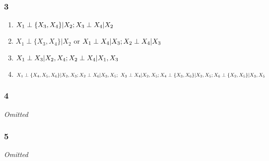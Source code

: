 \documentclass[11pt]{article}
\begin{document}
\begin{figure}[H]
\centering
\end{figure}

\subsubsection*{3}

\begin{enumerate}[label=(\alph*)]
    \item $X_1 \perp \{X_3, X_4\} | X_2; \\
    X_3 \perp X_4 | X_2$
    \item $X_1 \perp \{X_3, X_4\} | X_2$ or $X_1 \perp X_4 | X_3; \\ 
    X_2 \perp X_4 | X_3$
    \item $X_1 \perp X_3 | X_2, X_4; \\ 
    X_2 \perp X_4 | X_1, X_3$
    \item $X_1 \perp \{X_4, X_5, X_6\} | X_2, X_3; \\ 
    X_2 \perp X_6 | X_3, X_5; \ X_3 \perp X_4 | X_2, X_5; \\ 
    X_4 \perp \{X_3,X_6\} | X_2, X_5; \\ 
    X_6 \perp \{X_2, X_5\} | X_3, X_5$
\end{enumerate}

\subsubsection*{4}
\textit{Omitted }


    \iffalse 
        Consider $X_i \sim \text{Bernoulli}(p_i), i \in [3]$. Define $\Psymb(X_i=1, X_j=1) = p_{ij}$, noting that $X_i \perp X_j \Rightarrow p_{ij} = p_i p_j$. Under $H_0: p_{12|3} = p_{1|3}p_{2|3}$ and under $H_A: p_{12|3} \not=  p_{1|3}p_{2|3}$. 
        
        \begin{align*}
            \lambda 
            &= 
            \frac{
            \Psymb(X_1 = x_1 | X_3)
            \Psymb(X_2 = x_2 | X_3)
            }{
            \Psymb(X_1 = x_1, X_2 = x_2 | X_3)
            }
            \\
            &=
            \frac{
            p_{1|3}^{x_1} (1-p_{1|3})^{1-x_1}
            p_{2|3}^{x_2} (1-p_{2|3})^{1-x_2}
            }{
            asdf
            }
        \end{align*}
    \fi 

\subsubsection*{5}
\textit{Omitted}
\end{document}
